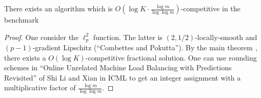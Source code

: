 \begin{theorem}
There exists an algorithm which is $O(\log K \cdot \frac{\log m}{ \log \log m})$-competitive in the benchmark
\end{theorem}
%
\begin{proof}
One consider the $\ell_{p}^{2}$ function. The latter is $(2,1/2)$-locally-smooth and $(p-1)$-gradient Lipschitz (``Combettes and Pokutta'').
By the main theorem , 
there exists a $O(\log K)$-competitive fractional solution.
One can use rounding schemes in ``Online Unrelated Machine Load Balancing with Predictions Revisited'' of Shi Li and Xian in ICML to get an integer assignment with a multiplicative factor of $\frac{\log m}{ \log \log m}$.
\end{proof}

